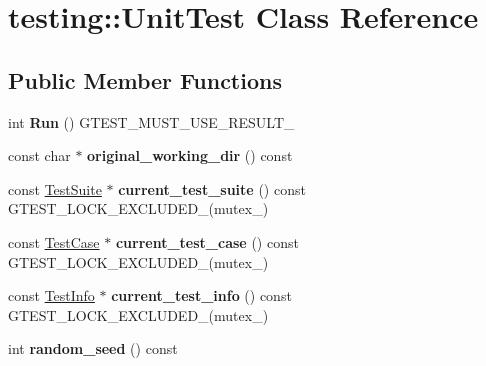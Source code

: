\hypertarget{classtesting_1_1UnitTest}{}\section{testing\+:\+:Unit\+Test Class Reference}
\label{classtesting_1_1UnitTest}
\subsection*{Public Member Functions}
\begin{DoxyCompactItemize}
\item 
\mbox{\label{classtesting_1_1UnitTest_a2febc800536b44500565f4c423f359d3}} 
int {\bfseries Run} () G\+T\+E\+S\+T\+\_\+\+M\+U\+S\+T\+\_\+\+U\+S\+E\+\_\+\+R\+E\+S\+U\+L\+T\+\_\+
\item 
\mbox{\label{classtesting_1_1UnitTest_af35839566385e14f6b31232489112621}} 
const char $\ast$ {\bfseries original\+\_\+working\+\_\+dir} () const
\item 
\mbox{\label{classtesting_1_1UnitTest_aafbaafe78ecb5c3dd76849385b04d35e}} 
const \mbox{\hyperlink{classtesting_1_1TestSuite}{Test\+Suite}} $\ast$ {\bfseries current\+\_\+test\+\_\+suite} () const G\+T\+E\+S\+T\+\_\+\+L\+O\+C\+K\+\_\+\+E\+X\+C\+L\+U\+D\+E\+D\+\_\+(mutex\+\_\+)
\item 
\mbox{\label{classtesting_1_1UnitTest_a2bf61896036ae03edbd7bceed14f9e18}} 
const \mbox{\hyperlink{classtesting_1_1TestSuite}{Test\+Case}} $\ast$ {\bfseries current\+\_\+test\+\_\+case} () const G\+T\+E\+S\+T\+\_\+\+L\+O\+C\+K\+\_\+\+E\+X\+C\+L\+U\+D\+E\+D\+\_\+(mutex\+\_\+)
\item 
\mbox{\label{classtesting_1_1UnitTest_a088eaf814a33085ace3d881d22e6bdea}} 
const \mbox{\hyperlink{classtesting_1_1TestInfo}{Test\+Info}} $\ast$ {\bfseries current\+\_\+test\+\_\+info} () const G\+T\+E\+S\+T\+\_\+\+L\+O\+C\+K\+\_\+\+E\+X\+C\+L\+U\+D\+E\+D\+\_\+(mutex\+\_\+)
\item 
\mbox{\label{classtesting_1_1UnitTest_adddc090a06f2d3a0e68f3762ee262688}} 
int {\bfseries random\+\_\+seed} () const
\item 

\end{DoxyCompactItemize}
